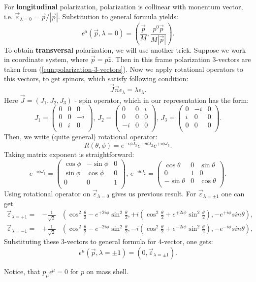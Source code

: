 \documentclass[12pt]{revtex4-1}
\newcommand{\jx}{\left( \begin{array}{ccc}
0 & 0 & 0 \\
0 & 0 & -i \\
0 & i & 0 \\
\end{array}
\right)}
\newcommand{\jy}{\left( \begin{array}{ccc}
0 & 0 & i \\
0 & 0 & 0 \\
-i & 0 & 0 \\
\end{array}
\right)}
\newcommand{\jz}{\left( \begin{array}{ccc}
0 & -i & 0 \\
i & 0 & 0 \\
0 & 0 & 0 \\
\end{array}
\right)}
\begin{document}
For \textbf{longitudinal} polarization, polarization is collinear with
monentum vector, i.e. $\vec{\varepsilon}_{\lambda = 0} = \vec{p}/|\vec{p}|$.
Substitution to general formula yields:
\begin{equation}
	\epsilon^{\mu}(\vec p, \lambda = 0) = \left( \frac{\vec{p}}{M} ,
	\frac{p^0 \vec{p}}{M |\vec{p}|}	\right).
\end{equation}
To obtain \textbf{transversal} polarization, we will use another trick.
Suppose we work in coordinate system, where $\vec{p} = p \hat{z}$.
Then in this frame polarization 3-vectors are taken from 
(\ref{eqn:polarization-3-vectors}). Now we apply rotational operators
to this vectors, to get spinors, which satisfy following condition:
\begin{equation}
	\vec{J}\vec{n} \epsilon_{\lambda} = \lambda \epsilon_{\lambda}.
\end{equation}
Here $\vec{J} = (J_1, J_2, J_3)$ - spin operator, which in our representation
has the form:
\begin{equation}
	J_1 = \jx,\, J_2 = \jy,\, J_3 = \jz. 
\end{equation}
Then, we write (quite general) rotational operator:
\begin{equation}
	R(\theta, \phi) = e^{-i \phi J_3} e^{- i \theta J_2} e^{+ i \phi J_3}.
\end{equation}
Taking matrix exponent is straightforward:
\begin{equation*}
e^{-i \phi J_3} = 
\left(
\begin{array}{ccc}
 \cos \phi & -\sin\phi & 0 \\
 \sin \phi & \cos \phi & 0 \\
 0 & 0 & 1 \\
\end{array}
\right),\,
e^{-i \theta J_2} = 
\left(
\begin{array}{ccc}
 \cos \theta & 0 & \sin \theta \\
 0 & 1 & 0 \\
 -\sin \theta & 0 & \cos \theta \\
\end{array}
\right).
\end{equation*}
Using rotational operator on $\vec \varepsilon_{\lambda = 0}$ gives us
previous result. For $\vec \varepsilon_{\lambda = \pm 1}$ one can get
\begin{align} \label{eqn:polarization-3-vectors}
	\vec{\varepsilon}_{\lambda = +1}= & -\frac{1}{\sqrt{2}} &
	\left(\cos^2 \frac{\theta}{2} - e^{+2 i \phi}\sin^2 \frac{\theta}{2} ,
	+i(\cos^2 \frac{\theta}{2} + e^{+2 i \phi}\sin^2 \frac{\theta}{2}) ,
	- e^{+i \phi} sin \theta \right),
	\\
	\vec{\varepsilon}_{\lambda = -1}= & +\frac{1}{\sqrt{2}} &
	\left(\cos^2 \frac{\theta}{2} - e^{-2 i \phi}\sin^2 \frac{\theta}{2} , 
	-i(\cos^2 \frac{\theta}{2} + e^{-2 i \phi}\sin^2 \frac{\theta}{2}) ,
	- e^{-i \phi} sin \theta \right),
\end{align}
Substituting these 3-vectors to general formula for 4-vector, one gets:
\begin{equation}
	\epsilon^{\mu}(\vec p, \lambda = \pm 1) = \left( 0 ,
	\vec{\varepsilon}_{\lambda = \pm 1} \right).
\end{equation}

Notice, that $p_{\mu} \epsilon^{\mu} = 0$ for $p$ on mass shell.
\end{document}
